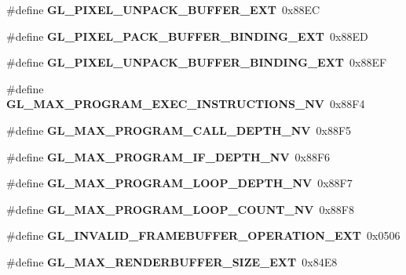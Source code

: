 \begin{DoxyCompactItemize}
\item 
\#define {\bfseries G\+L\+\_\+\+P\+I\+X\+E\+L\+\_\+\+U\+N\+P\+A\+C\+K\+\_\+\+B\+U\+F\+F\+E\+R\+\_\+\+E\+X\+T}~0x88\+E\+C\label{_s_d_l__opengl_8h_a4638afec0f4636f396796aeff7884310}

\item 
\#define {\bfseries G\+L\+\_\+\+P\+I\+X\+E\+L\+\_\+\+P\+A\+C\+K\+\_\+\+B\+U\+F\+F\+E\+R\+\_\+\+B\+I\+N\+D\+I\+N\+G\+\_\+\+E\+X\+T}~0x88\+E\+D\label{_s_d_l__opengl_8h_ab2cb03cc173fa663bec83111251f6d94}

\item 
\#define {\bfseries G\+L\+\_\+\+P\+I\+X\+E\+L\+\_\+\+U\+N\+P\+A\+C\+K\+\_\+\+B\+U\+F\+F\+E\+R\+\_\+\+B\+I\+N\+D\+I\+N\+G\+\_\+\+E\+X\+T}~0x88\+E\+F\label{_s_d_l__opengl_8h_afca1b2c3a11b046b45e36fc15b4c47a2}

\item 
\#define {\bfseries G\+L\+\_\+\+M\+A\+X\+\_\+\+P\+R\+O\+G\+R\+A\+M\+\_\+\+E\+X\+E\+C\+\_\+\+I\+N\+S\+T\+R\+U\+C\+T\+I\+O\+N\+S\+\_\+\+N\+V}~0x88\+F4\label{_s_d_l__opengl_8h_a9a07e39a9f85010d2d84b7000722f338}

\item 
\#define {\bfseries G\+L\+\_\+\+M\+A\+X\+\_\+\+P\+R\+O\+G\+R\+A\+M\+\_\+\+C\+A\+L\+L\+\_\+\+D\+E\+P\+T\+H\+\_\+\+N\+V}~0x88\+F5\label{_s_d_l__opengl_8h_a70f97fd906222a02e7390b29a0c5b301}

\item 
\#define {\bfseries G\+L\+\_\+\+M\+A\+X\+\_\+\+P\+R\+O\+G\+R\+A\+M\+\_\+\+I\+F\+\_\+\+D\+E\+P\+T\+H\+\_\+\+N\+V}~0x88\+F6\label{_s_d_l__opengl_8h_a9f75abc6527c02beb8a5c0c8c47f358b}

\item 
\#define {\bfseries G\+L\+\_\+\+M\+A\+X\+\_\+\+P\+R\+O\+G\+R\+A\+M\+\_\+\+L\+O\+O\+P\+\_\+\+D\+E\+P\+T\+H\+\_\+\+N\+V}~0x88\+F7\label{_s_d_l__opengl_8h_a1207e92618c63aeeffa51a9c5d34e054}

\item 
\#define {\bfseries G\+L\+\_\+\+M\+A\+X\+\_\+\+P\+R\+O\+G\+R\+A\+M\+\_\+\+L\+O\+O\+P\+\_\+\+C\+O\+U\+N\+T\+\_\+\+N\+V}~0x88\+F8\label{_s_d_l__opengl_8h_a96cfd13625808759850c0c9b6aa7ebb8}

\item 
\#define {\bfseries G\+L\+\_\+\+I\+N\+V\+A\+L\+I\+D\+\_\+\+F\+R\+A\+M\+E\+B\+U\+F\+F\+E\+R\+\_\+\+O\+P\+E\+R\+A\+T\+I\+O\+N\+\_\+\+E\+X\+T}~0x0506\label{_s_d_l__opengl_8h_a40e4302481280dfea42fefe95f8a4946}

\item 
\#define {\bfseries G\+L\+\_\+\+M\+A\+X\+\_\+\+R\+E\+N\+D\+E\+R\+B\+U\+F\+F\+E\+R\+\_\+\+S\+I\+Z\+E\+\_\+\+E\+X\+T}~0x84\+E8\label{_s_d_l__opengl_8h_a473758b67779f4b4e6f319f3693a5387}


\end{DoxyCompactItemize}
